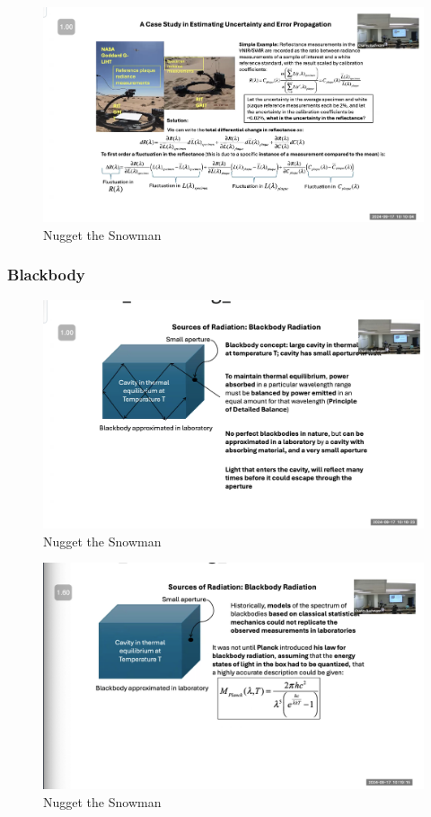 \documentclass{article}
\begin{document}
\begin{figure}[h!]
\centering
\includegraphics[scale=.6]{Radiometry/Week4/Notes/Sept17/Goiniometer.png}
\caption{Nugget the Snowman}
\label{fig:Goiniometer}
\end{figure}
\clearpage

\subsubsection{Blackbody}


\begin{figure}[h!]
\centering
\includegraphics[scale=.6]{Radiometry/Week4/Notes/Sept17/Blackbody.png}
\caption{Nugget the Snowman}
\label{fig:Blackbody}
\end{figure}

\begin{figure}[h!]
\centering
\includegraphics[scale=.6]{Radiometry/Week4/Notes/Sept17/Blackbody2.png}
\caption{Nugget the Snowman}
\label{fig:Blackbody2}
\end{figure}
\clearpage
\end{document}
